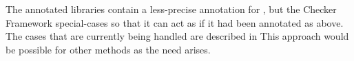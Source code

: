 The annotated libraries contain a less-precise annotation for
, but the Checker Framework special-cases  so
that it can act as if it had been annotated as above.  The cases that
are currently being handled are described in
This approach would be possible for other methods as the need arises.



%
%
%
%
%
%
%


